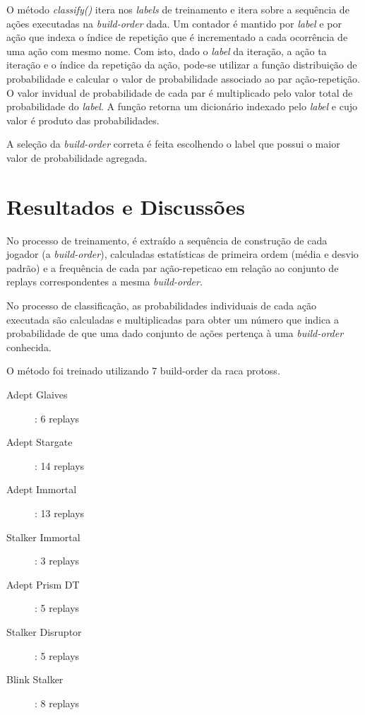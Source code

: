 O método \textit{classify()} itera nos \textit{labels} de treinamento e itera sobre a sequência de ações executadas na \textit{\gls{build-order}} dada. Um contador é mantido por \textit{label} e por ação que indexa o índice de repetição que é incrementado a cada ocorrência de uma ação com mesmo nome. Com isto, dado o \textit{label} da iteração, a ação ta iteração e o índice da repetição da ação, pode-se utilizar a função distribuição de probabilidade e calcular o valor de probabilidade associado ao par ação-repetição. O valor invidual de probabilidade de cada par é multiplicado pelo valor total de probabilidade do \textit{label}. A função retorna um dicionário indexado pelo \textit{label} e cujo valor é produto das probabilidades.

A seleção da \textit{\gls{build-order}} correta é feita escolhendo o label que possui o maior valor de probabilidade agregada.

	\chapter{Resultados e Discussões}

No processo de treinamento, é extraído a sequência de construção de cada jogador (a \textit{\gls{build-order}}), calculadas estatísticas de primeira ordem (média e desvio padrão) e a frequência de cada par ação-\gls{repeticao} em relação ao conjunto de \glspl{replay} correspondentes a mesma \textit{\gls{build-order}}.

No processo de classificação, as probabilidades individuais de cada ação executada são calculadas e multiplicadas para obter um número que indica a probabilidade de que uma dado conjunto de ações pertença à uma \textit{\gls{build-order}} conhecida.

O método foi treinado utilizando 7 \gls{build-order} da \gls{raca} \Gls{protoss}.

\begin{description}
	\item[Adept Glaives]: 6 \glspl{replay}
	\item[Adept Stargate]: 14 \glspl{replay}
	\item[Adept Immortal]: 13 \glspl{replay}
	\item[Stalker Immortal]: 3 \glspl{replay}
	\item[Adept Prism DT]: 5 \glspl{replay}
	\item[Stalker Disruptor]: 5 \glspl{replay}
	\item[Blink Stalker]: 8 \glspl{replay}
\end{description}

